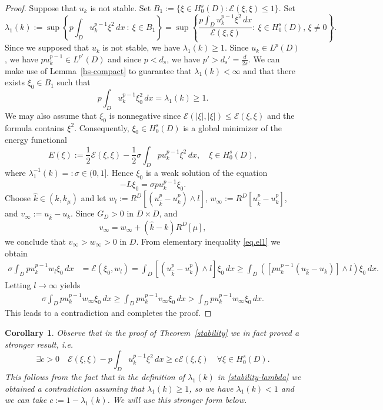 \documentclass[11pt,a4paper,reqno]{amsart}
\newtheorem{corollary}[theorem]{\bf Corollary}
\theoremstyle{definition}
\numberwithin{equation}{section}
\begin{document}
\begin{proof}
Suppose  that $u_k$ is not stable. Set $B_1:=\{\xi\in H^s_0(D): \mathcal E(\xi,\xi)\le 1\}$.
Set
\begin{equation}\label{stability-lambda}
\lambda_1(k):=\sup\left\{p\int_D u_k^{p-1} \xi^2\,dx\ :\ \xi\in B_1 \right\}
=\sup\left\{\frac{p\int_D u_k^{p-1} \xi^2\,dx}{\mathcal E(\xi,\xi)}:\ \xi\in H_0^s(D),\, \xi\neq 0 \right\}.
\end{equation}
Since we supposed that $u_k$ is not stable, we have  $\lambda_1(k)\ge 1$.
Since $u_k\in L^p(D)$, we have $pu_k^{p-1}\in L^{p'}(D)$ and since $p<d_s$, we have 
$p'>d_s'=\frac{d}{2s}$. We can make use of Lemma~\ref{hs-compact} to guarantee that $\lambda_1(k)<\infty$ and that there  exists $\xi_0\in B_1$ such that
\[
p\int_D u_k^{p-1} \xi_0^2\,dx=\lambda_1(k)\ge 1.
\]
We may also assume that $\xi_0$ is nonnegative since $\mathcal{E}(|\xi|,|\xi|)\le\mathcal{E}(\xi,\xi)$ and the formula contains $\xi^2$. 
Consequently, $\xi_0\in H^s_0(D)$  is a global minimizer of the energy functional
\[
E(\xi):=\frac{1}{2}\mathcal{E}(\xi,\xi)-\frac{1}{2}\sigma\int_D pu_k^{p-1} \xi^2\,dx,\quad \xi\in H^s_0(D),
\] 
where $\lambda^{-1}_1(k)=:\sigma\in(0,1]$. Hence $\xi_0$ is a weak solution of the equation
\[
-L\xi_0=\sigma pu_k^{p-1}\xi_0.
\]
Choose $\hat{k}\in(k,k_\mu)$ and let $w_l:=R^D[(u^p_{\hat{k}}-u^p_k)\wedge l]$,
$w_\infty:=R^D[u^p_{\hat{k}}-u^p_k]$, and $v_\infty:= u_{\hat{k}}-u_k$. 
Since $G_D>0$ in $D\times D$, and 
\[
v_\infty=w_\infty+(\hat{k}-k)R^D[\mu],
\]
we conclude that $v_\infty>w_\infty>0$ in $D$.
From  elementary inequality \eqref{eq.el1}
we obtain
\begin{align*}
\sigma\int_D pu_k^{p-1}w_l\xi_0\,dx&=\mathcal{E}(\xi_0,w_l)=\int_D[(u^p_{\hat{k}}-u^p_k)\wedge l]\xi_0\,dx\ge \int_D \left([pu_k^{p-1}(u_{\hat{k}}-u_k)]\wedge l\right) \xi_0\,dx.%
\end{align*}
Letting $l\to \infty$ yields
\begin{align*}
\sigma\int_D pu_k^{p-1}w_\infty\xi_0\,dx\ge \int_D pu_k^{p-1}v_\infty\xi_0\,dx>\int_D pu_k^{p-1}w_\infty\xi_0\,dx.%
\end{align*}
This leads to a contradiction and completes the proof.
\end{proof}
\begin{corollary}\label{stability-stronger}
Observe that in the proof of Theorem~\ref{stability} we in fact proved a stronger result, i.e.
\begin{equation}\label{stability-strong}
\exists c>0 \quad \mathcal E(\xi,\xi)-p\int_D u^{p-1}_k \xi^2\,dx\ge c\mathcal E(\xi,\xi)\quad \forall\xi\in H^s_0(D).
\end{equation}
This follows from the fact that in the definition of $\lambda_1(k)$ in \eqref{stability-lambda} we obtained a contradiction assuming that $\lambda_1(k)\ge1$, so we have $\lambda_1(k)<1$ and we can take $c:=1-\lambda_1(k)$. We will use this stronger form below.
\end{corollary}
\end{document}
